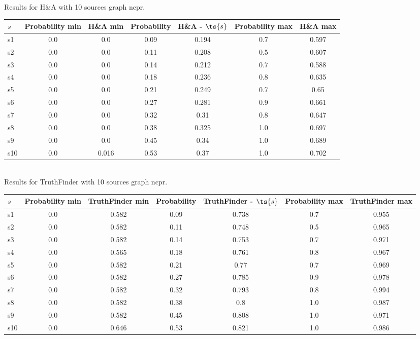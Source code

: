 \documentclass{article}
\begin{document}
\noindent Results for H\&A with 10 sources graph ncpr.

\noindent\begin{tabular}{|l|c|c|c|c|c|c|}
\hline
$s$& Probability min & H\&A min & Probability & H\&A - $\ts{s}$ & Probability max & H\&A max\\
\hline
s1 &0.0 & 0.0 & 0.09 & 0.194 & 0.7 & 0.597\\
\hline
s2 &0.0 & 0.0 & 0.11 & 0.208 & 0.5 & 0.607\\
\hline
s3 &0.0 & 0.0 & 0.14 & 0.212 & 0.7 & 0.588\\
\hline
s4 &0.0 & 0.0 & 0.18 & 0.236 & 0.8 & 0.635\\
\hline
s5 &0.0 & 0.0 & 0.21 & 0.249 & 0.7 & 0.65\\
\hline
s6 &0.0 & 0.0 & 0.27 & 0.281 & 0.9 & 0.661\\
\hline
s7 &0.0 & 0.0 & 0.32 & 0.31 & 0.8 & 0.647\\
\hline
s8 &0.0 & 0.0 & 0.38 & 0.325 & 1.0 & 0.697\\
\hline
s9 &0.0 & 0.0 & 0.45 & 0.34 & 1.0 & 0.689\\
\hline
s10 &0.0 & 0.016 & 0.53 & 0.37 & 1.0 & 0.702\\
\hline
\end{tabular}\\

\noindent Results for TruthFinder with 10 sources graph ncpr.

\noindent\begin{tabular}{|l|c|c|c|c|c|c|}
\hline
$s$& Probability min & TruthFinder min & Probability & TruthFinder - $\ts{s}$ & Probability max & TruthFinder max\\
\hline
s1 &0.0 & 0.582 & 0.09 & 0.738 & 0.7 & 0.955\\
\hline
s2 &0.0 & 0.582 & 0.11 & 0.748 & 0.5 & 0.965\\
\hline
s3 &0.0 & 0.582 & 0.14 & 0.753 & 0.7 & 0.971\\
\hline
s4 &0.0 & 0.565 & 0.18 & 0.761 & 0.8 & 0.967\\
\hline
s5 &0.0 & 0.582 & 0.21 & 0.77 & 0.7 & 0.969\\
\hline
s6 &0.0 & 0.582 & 0.27 & 0.785 & 0.9 & 0.978\\
\hline
s7 &0.0 & 0.582 & 0.32 & 0.793 & 0.8 & 0.994\\
\hline
s8 &0.0 & 0.582 & 0.38 & 0.8 & 1.0 & 0.987\\
\hline
s9 &0.0 & 0.582 & 0.45 & 0.808 & 1.0 & 0.971\\
\hline
s10 &0.0 & 0.646 & 0.53 & 0.821 & 1.0 & 0.986\\
\hline
\end{tabular}\\
\end{document}
